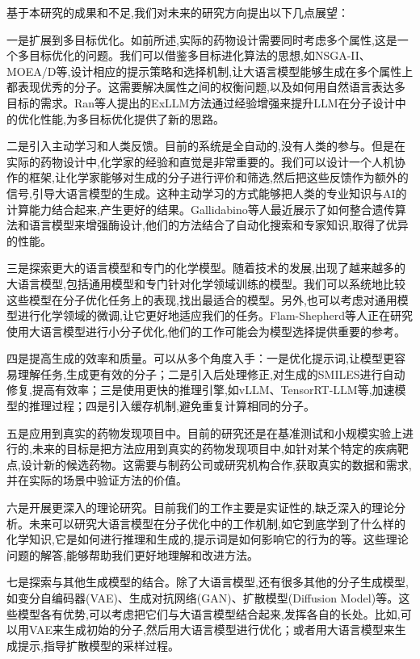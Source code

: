 基于本研究的成果和不足,我们对未来的研究方向提出以下几点展望：

一是扩展到多目标优化。如前所述,实际的药物设计需要同时考虑多个属性,这是一个多目标优化的问题。我们可以借鉴多目标进化算法的思想,如NSGA-II、MOEA/D等,设计相应的提示策略和选择机制,让大语言模型能够生成在多个属性上都表现优秀的分子。这需要解决属性之间的权衡问题,以及如何用自然语言表达多目标的需求。Ran等人\cite{ran2025exllm}提出的ExLLM方法通过经验增强来提升LLM在分子设计中的优化性能,为多目标优化提供了新的思路。

二是引入主动学习和人类反馈。目前的系统是全自动的,没有人类的参与。但是在实际的药物设计中,化学家的经验和直觉是非常重要的。我们可以设计一个人机协作的框架,让化学家能够对生成的分子进行评价和筛选,然后把这些反馈作为额外的信号,引导大语言模型的生成。这种主动学习的方式能够把人类的专业知识与AI的计算能力结合起来,产生更好的结果。Gallidabino等人\cite{gallidabino2024integrating}最近展示了如何整合遗传算法和语言模型来增强酶设计,他们的方法结合了自动化搜索和专家知识,取得了优异的性能。

三是探索更大的语言模型和专门的化学模型。随着技术的发展,出现了越来越多的大语言模型,包括通用模型和专门针对化学领域训练的模型。我们可以系统地比较这些模型在分子优化任务上的表现,找出最适合的模型。另外,也可以考虑对通用模型进行化学领域的微调,让它更好地适应我们的任务。Flam-Shepherd等人\cite{flam2025small}正在研究使用大语言模型进行小分子优化,他们的工作可能会为模型选择提供重要的参考。

四是提高生成的效率和质量。可以从多个角度入手：一是优化提示词,让模型更容易理解任务,生成更有效的分子；二是引入后处理修正,对生成的SMILES进行自动修复,提高有效率；三是使用更快的推理引擎,如vLLM、TensorRT-LLM等,加速模型的推理过程；四是引入缓存机制,避免重复计算相同的分子。

五是应用到真实的药物发现项目中。目前的研究还是在基准测试和小规模实验上进行的,未来的目标是把方法应用到真实的药物发现项目中,如针对某个特定的疾病靶点,设计新的候选药物。这需要与制药公司或研究机构合作,获取真实的数据和需求,并在实际的场景中验证方法的价值。

六是开展更深入的理论研究。目前我们的工作主要是实证性的,缺乏深入的理论分析。未来可以研究大语言模型在分子优化中的工作机制,如它到底学到了什么样的化学知识,它是如何进行推理和生成的,提示词是如何影响它的行为的等。这些理论问题的解答,能够帮助我们更好地理解和改进方法。

七是探索与其他生成模型的结合。除了大语言模型,还有很多其他的分子生成模型,如变分自编码器(VAE)、生成对抗网络(GAN)、扩散模型(Diffusion Model)等。这些模型各有优势,可以考虑把它们与大语言模型结合起来,发挥各自的长处。比如,可以用VAE来生成初始的分子,然后用大语言模型进行优化；或者用大语言模型来生成提示,指导扩散模型的采样过程。

